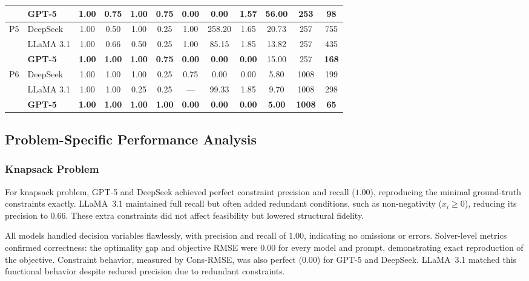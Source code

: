 \documentclass[review,12pt]{elsarticle}
\begin{document}
\begin{table}[htbp]
\begin{adjustbox}{max width=\textwidth}
\begin{tabular}{c l c c c c c c c c c c}
   & GPT-5 & 1.00 & 0.75 & 1.00 & 0.75 & 0.00 & 0.00 & 1.57 & 56.00 & 253 & 98 \\
\midrule
P5 & DeepSeek & 1.00 & 0.50 & 1.00 & 0.25 & 1.00 & 258.20 & 1.65 & 20.73 & 257 & 755 \\[-4pt]
   & LLaMA 3.1 & 1.00 & 0.66 & 0.50 & 0.25 & 1.00 & 85.15 & 1.85 & 13.82 & 257 & 435 \\[-4pt]
   & \textbf{GPT-5} & \textbf{1.00} & \textbf{1.00} & \textbf{1.00} & \textbf{0.75} & \textbf{0.00} & \textbf{0.00} & \textbf{0.00} & 15.00 & 257 & \textbf{168} \\
\midrule
P6 & DeepSeek & 1.00 & 1.00 & 1.00 & 0.25 & 0.75 & 0.00 & 0.00 & 5.80 & 1008 & 199 \\[-4pt]
   & LLaMA 3.1 & 1.00 & 1.00 & 0.25 & 0.25 & --- & 99.33 & 1.85 & 9.70 & 1008 & 298 \\[-4pt]
   & \textbf{GPT-5} & \textbf{1.00} & \textbf{1.00} & \textbf{1.00} & \textbf{1.00} & \textbf{0.00} & \textbf{0.00} & \textbf{0.00} & \textbf{5.00} & \textbf{1008} & \textbf{65} \\
\bottomrule
\end{tabular}
\end{adjustbox}
\end{table}


\subsection{Problem-Specific Performance Analysis}

\subsubsection{Knapsack Problem} 
For knapsack problem, GPT-5 and DeepSeek achieved perfect constraint precision and recall ($1.00$), reproducing the minimal ground-truth constraints exactly. LLaMA~3.1 maintained full recall but often added redundant conditions, such as non-negativity (\(x_i \geq 0\)), reducing its precision to $0.66$. These extra constraints did not affect feasibility but lowered structural fidelity.

All models handled decision variables flawlessly, with precision and recall of $1.00$, indicating no omissions or errors. Solver-level metrics confirmed correctness: the optimality gap and objective RMSE were $0.00$ for every model and prompt, demonstrating exact reproduction of the objective. Constraint behavior, measured by Cons-RMSE, was also perfect ($0.00$) for GPT-5 and DeepSeek. LLaMA~3.1 matched this functional behavior despite reduced precision due to redundant constraints.
\end{document}
